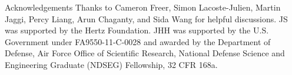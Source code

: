 \documentclass[final]{beamer}
\begin{document}
\begin{frame}{}
\begin{columns}
\begin{column}{0.50\linewidth}
\begin{block}{\small Acknowledgements}
{\tiny Thanks to Cameron Freer, Simon Lacoste-Julien, Martin Jaggi, Percy Liang, Arun Chaganty, and Sida Wang 
for helpful discussions. JS was supported by the Hertz Foundation. JHH was supported by the U.S. Government under FA9550-11-C-0028 and awarded by the Department of Defense, Air Force Office of Scientific Research, National Defense Science and Engineering Graduate (NDSEG) Fellowship, 32 CFR 168a.}
\end{block}

%
%


\end{column}

\end{columns}
\end{frame}
\end{document}
